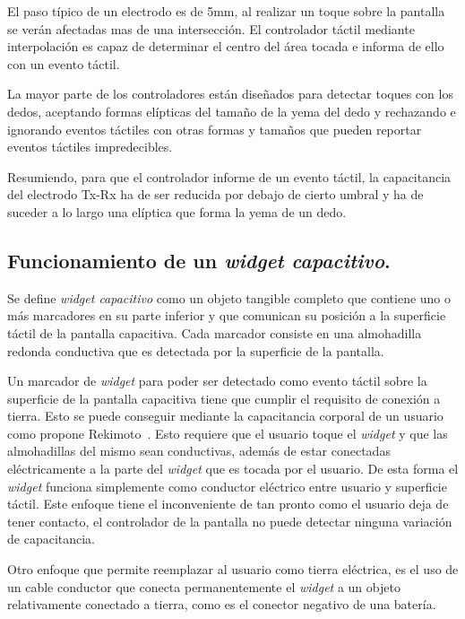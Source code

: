 El paso típico de un electrodo es de 5mm, al realizar un toque sobre la pantalla se verán afectadas mas de una intersección. El controlador táctil mediante interpolación es capaz de determinar el centro del área tocada e informa de ello con un evento táctil.

La mayor parte de los controladores están diseñados para detectar toques con los dedos, aceptando formas elípticas del tamaño de la yema del dedo y rechazando e ignorando eventos táctiles con otras formas y tamaños que pueden reportar eventos táctiles impredecibles.

Resumiendo, para que el controlador informe de un evento táctil, la capacitancia del electrodo Tx-Rx ha de ser reducida por debajo de cierto umbral y ha de suceder a lo largo una elíptica que forma la yema de un dedo.


\subsection{Funcionamiento de un \emph{widget capacitivo}.}

Se define \emph{widget capacitivo} como un objeto tangible completo que contiene uno o más marcadores en su parte inferior y que comunican su posición a la superficie táctil de la pantalla capacitiva. Cada marcador consiste en una almohadilla redonda conductiva que es detectada por la superficie de la pantalla.

Un marcador de \emph{widget} para poder ser detectado como evento táctil sobre la superficie de la pantalla capacitiva tiene que cumplir el requisito de conexión a tierra. Esto se puede conseguir mediante la capacitancia corporal de un usuario como propone Rekimoto~\cite{Rekimoto}. Esto requiere que el usuario toque el \emph{widget} y que las almohadillas del mismo sean conductivas, además de estar conectadas eléctricamente a la parte del \emph{widget} que es tocada por el usuario. De esta forma el \emph{widget} funciona simplemente como conductor eléctrico entre usuario y superficie táctil. Este enfoque tiene el inconveniente de tan pronto como el usuario deja de tener contacto, el controlador de la pantalla no puede detectar ninguna variación de capacitancia.

Otro enfoque que permite reemplazar al usuario como tierra eléctrica, es el uso de un cable conductor que conecta permanentemente el \emph{widget} a un objeto relativamente conectado a tierra, como es el conector negativo de una batería.





